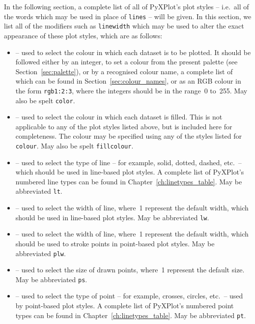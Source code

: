 In the following section, a complete list of all of PyXPlot's plot styles --
i.e.\ all of the words which may be used in place of {\tt lines} -- will be
given. In this section, we list all of the modifiers such as {\tt line\-width}
which may be used to alter the exact appearance of these plot styles, which are
as follows:
\begin{itemize}
\item {} -- used to select the colour in which each dataset is to be plotted. It should be followed either by an integer, to set a colour from the present palette (see Section~\ref{sec:palette}), or by a recognised colour name, a complete list of which can be found in Section~\ref{sec:colour_names}, or as an RGB colour in the form {\tt rgb1:2:3}, where the integers should be in the range~0 to~255. May also be spelt {\tt color}.
\item {} -- used to select the colour in which each dataset is filled. This is not applicable to any of the plot styles listed above, but is included here for completeness. The colour may be specified using any of the styles listed for {\tt colour}. May also be spelt {\tt fillcolour}.
\item {} -- used to select the type of line -- for example, solid, dotted, dashed, etc.\ -- which should be used in line-based plot styles. A complete list of PyXPlot's numbered line types can be found in Chapter~\ref{ch:linetypes_table}. May be abbreviated {\tt lt}.
\item {} -- used to select the width of line, where~1 represent the default width, which should be used in line-based plot styles. May be abbreviated {\tt lw}.
\item {} -- used to select the width of line, where~1 represent the default width, which should be used to stroke points in point-based plot styles. May be abbreviated {\tt plw}.
\item {} -- used to select the size of drawn points, where~1 represent the default size. May be abbreviated {\tt ps}.
\item {} -- used to select the type of point -- for example, crosses, circles, etc.\ -- used by point-based plot styles. A complete list of PyXPlot's numbered point types can be found in Chapter~\ref{ch:linetypes_table}. May be abbreviated {\tt pt}.
\end{itemize}

